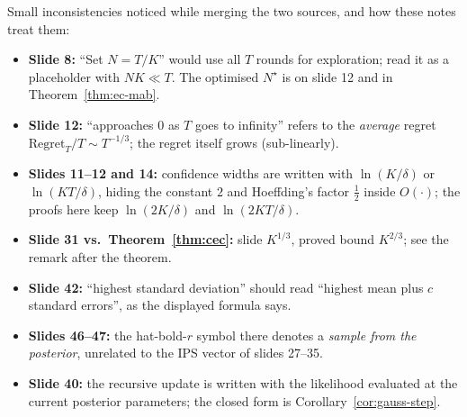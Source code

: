\documentclass[11pt,a4paper]{article}
\newcommand{\Reg}{\mathrm{Regret}}
\theoremstyle{plain}
\theoremstyle{definition}
\theoremstyle{remark}
\begin{document}
Small inconsistencies noticed while merging the two sources, and how these notes treat them:
\begin{itemize}
 \item \textbf{Slide 8:} ``Set $N=T/K$'' would use all $T$ rounds for exploration; read it as a placeholder with $NK\ll T$. The optimised $N^\star$ is on slide 12 and in Theorem~\ref{thm:ec-mab}.
 \item \textbf{Slide 12:} ``approaches 0 as $T$ goes to infinity'' refers to the \emph{average} regret $\Reg_T/T\sim T^{-1/3}$; the regret itself grows (sub-linearly).
 \item \textbf{Slides 11--12 and 14:} confidence widths are written with $\ln(K/\delta)$ or $\ln(KT/\delta)$, hiding the constant $2$ and Hoeffding's factor $\tfrac12$ inside $O(\cdot)$; the proofs here keep $\ln(2K/\delta)$ and $\ln(2KT/\delta)$.
 \item \textbf{Slide 31 vs.\ Theorem~\ref{thm:cec}:} slide $K^{1/3}$, proved bound $K^{2/3}$; see the remark after the theorem.
 \item \textbf{Slide 42:} ``highest standard deviation'' should read ``highest mean plus $c$ standard errors'', as the displayed formula says.
 \item \textbf{Slides 46--47:} the hat-bold-$r$ symbol there denotes a \emph{sample from the posterior}, unrelated to the IPS vector of slides 27--35.
 \item \textbf{Slide 40:} the recursive update is written with the likelihood evaluated at the current posterior parameters; the closed form is Corollary~\ref{cor:gauss-step}.
\end{itemize}
\end{document}
